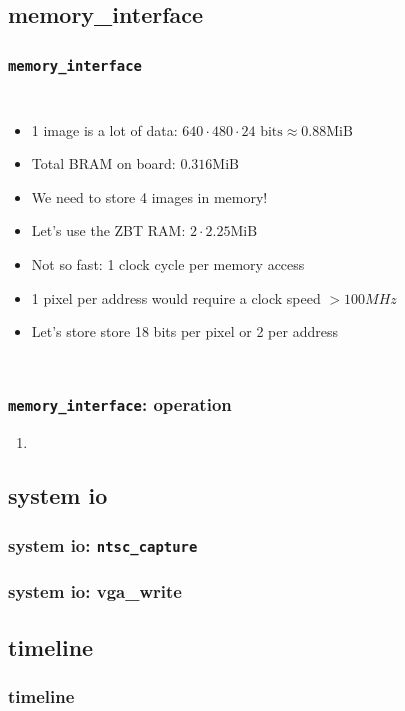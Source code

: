 \documentclass{beamer}
\begin{document}
\subsection{memory\_interface}
\begin{frame}
	\frametitle{{\tt memory\_interface}}
	\begin{columns}[t]
		\begin{itemize}
		\item<1-> 1 image is a lot of data: \( 640\cdot480\cdot24 \text{ bits} \approx 0.88 \text{MiB} \)
		\item<2-> Total BRAM on board: \( 0.316 \text{MiB} \)
		\item<3-> We need to store 4 images in memory!
		\item<4-> Let's use the ZBT RAM: \( 2\cdot2.25 \text{MiB} \)
		\item<5-> Not so fast: 1 clock cycle per memory access
		\item<6-> 1 pixel per address would require a clock speed \( > 100MHz \)
		\item<7-> Let's store store 18 bits per pixel or 2 per address
		\end{itemize}

	\end{columns}
\end{frame}

\begin{frame}
	\frametitle{{\tt memory\_interface}: operation}
	\begin{enumerate}
		\item
	\end{enumerate}
\end{frame}	

\subsection{system io}
\begin{frame}
	\frametitle{system io: {\tt ntsc\_capture}}
\end{frame}

\begin{frame}
	\frametitle{system io: vga\_write}
\end{frame}

\subsection{timeline}
\begin{frame}
	\frametitle{timeline}
\end{frame}
\end{document}
